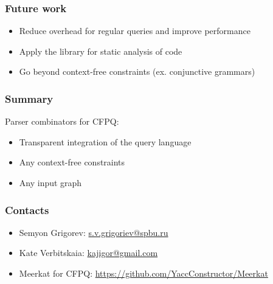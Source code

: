 \documentclass[xcolor=table]{beamer}
\begin{document}
\begin{frame}
  \transwipe[direction=90]
  \frametitle{Future work}         
\begin{itemize}
  \item Reduce overhead for regular queries and improve performance
  \item Apply the library for static analysis of code
  \item Go beyond context-free constraints (ex. conjunctive grammars)
\end{itemize}  
\end{frame}     
            
            
\begin{frame}
  \transwipe[direction=90]
  \frametitle{Summary}  
Parser combinators for CFPQ:

\begin{itemize}
  \item Transparent integration of the query language
  \item Any context-free constraints
  \item Any input graph
\end{itemize}       
\end{frame}           
            
\begin{frame}
\transwipe[direction=90]
\frametitle{Contacts}
\begin{itemize}
  \item Semyon Grigorev: \href{mailto:s.v.grigoriev@spbu.ru}{s.v.grigoriev@spbu.ru}
  \item Kate Verbitskaia: \href{mailto:kajigor@gmail.com}{kajigor@gmail.com}
\end{itemize}
\begin{itemize}
  \item Meerkat for CFPQ: \href{https://github.com/YaccConstructor/Meerkat}{https://github.com/YaccConstructor/Meerkat}
\end{itemize}
\end{frame}
\end{document}
